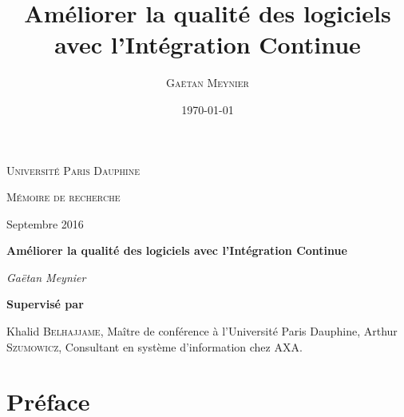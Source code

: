 \documentclass{report}
\title{Améliorer la qualité des logiciels avec l'Intégration Continue}
\author{\textsc{Gaëtan Meynier}}
\date{\today}
\begin{document}
  \begin{titlepage}
    \centering
    {\scshape\LARGE Université Paris Dauphine \par}
    \vspace{1cm}
	  {\scshape\Large Mémoire de recherche\par}
    \vspace{0.5cm}
    Septembre 2016\par
    \vspace{4.5cm}
    {\huge\bfseries Améliorer la qualité des logiciels avec l'Intégration Continue\par}
    \vspace{2cm}
	  {\Large\itshape Gaëtan Meynier\par}
    \vspace{5cm}
	  \vfill
	    {\bfseries Supervisé par\par}
      \vspace{0.5cm}
	    Khalid \textsc{Belhajjame}, Maître de conférence à l'Université Paris Dauphine,
      Arthur \textsc{Szumowicz}, Consultant en système d'information chez AXA.
	  \vfill
  \end{titlepage}

  \tableofcontents                %

  \chapter{Préface}
\end{document}
